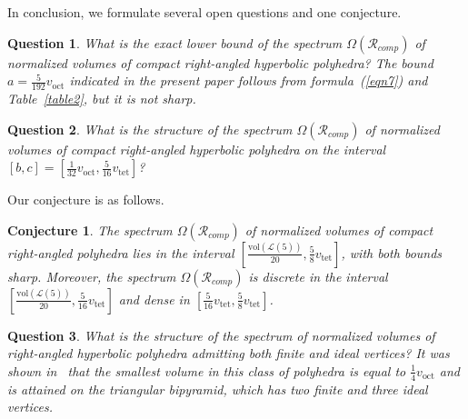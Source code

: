 \documentclass{amsart}
\newtheorem{question}{Question}[section]
\newtheorem{conjecture}{Conjecture}[section]
\newcommand{\vol}{\mathrm{vol}}
\newcommand{\voct}{v_{\mathrm{oct}}}
\newcommand{\vtet}{v_{\mathrm{tet}}}
\begin{document}
In conclusion, we formulate several open questions and one conjecture.
	
\begin{question} \label{question2}
{\rm 
What is the exact lower bound of the spectrum $\Omega(\mathcal R_{comp})$ of normalized volumes of compact right-angled hyperbolic polyhedra? The bound $a = \frac{5}{192} \voct$ indicated in the present paper follows from formula~(\ref{eqn7}) and Table~\ref{table2}, but it is not sharp.
}
\end{question}
	
\begin{question} \label{question3}
{\rm What is the structure of the spectrum $\Omega(\mathcal R_{comp})$ of normalized volumes of compact right-angled hyperbolic polyhedra on the interval $\left[ b, c \right] = \left[ \frac{1}{32} \voct, \frac{5}{16} \vtet \right]$?}
\end{question}

Our conjecture is as follows. 
\begin{conjecture}
{\rm The spectrum $\Omega(\mathcal R_{comp})$ of normalized volumes of compact right-angled polyhedra lies in the interval $\left[ \frac{\vol(\mathcal L(5))}{20}, \frac{5}{8} \vtet \right]$, with both bounds sharp. Moreover, the spectrum $\Omega(\mathcal R_{comp})$ is discrete in the interval $\left[ \frac{\vol(\mathcal L(5))}{20}, \frac{5}{16} \vtet \right]$ and dense in $\left[ \frac{5}{16} \vtet, \frac{5}{8} \vtet \right]$.}
\end{conjecture}

\begin{question} \label{question4}
 {\rm What is the structure of the spectrum of normalized volumes of right-angled hyperbolic polyhedra admitting both finite and ideal vertices? It was shown in~\cite{VeEg25} that the smallest volume in this class of polyhedra is equal to $\frac{1}{4} \voct$ and is attained on the triangular bipyramid, which has two finite and three ideal vertices.}
\end{question}
\end{document}
